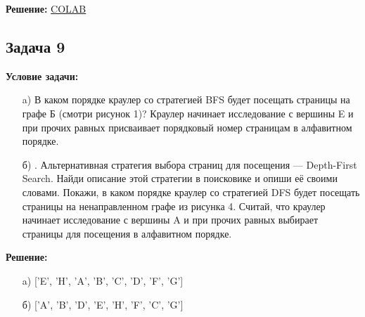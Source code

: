 \documentclass[a4paper,12pt]{article}
\begin{document}
\textbf{Решение:}
\href{https://colab.research.google.com/drive/1H1bMEVws8LbPNbGYGrFPi2vDS5lYgGls?usp=sharing}{COLAB}
\vspace{1cm}
\subsection{Задача 9}
\textbf{Условие задачи:}
\begin{itemize}
    \item[a)]  В каком порядке краулер со стратегией BFS будет посещать страницы на графе Б (смотри
рисунок 1)? Краулер начинает исследование с вершины E и при прочих равных присваивает
порядковый номер страницам в алфавитном порядке.                \item[б)] . Альтернативная стратегия выбора страниц для посещения — Depth-First Search. Найди описание этой стратегии в поисковике и опиши её своими словами. Покажи, в каком порядке краулер
со стратегией DFS будет посещать страницы на ненаправленном графе из рисунка 4. Считай,
что краулер начинает исследование с вершины A и при прочих равных выбирает страницы
для посещения в алфавитном порядке.
\end{itemize}

\textbf{Решение:}
\begin{itemize}
    \item[a)] ['E', 'H', 'A', 'B', 'C', 'D', 'F', 'G']\\
    \item[б)] ['A', 'B', 'D', 'E', 'H', 'F', 'C', 'G']
\end{itemize}
\end{document}
